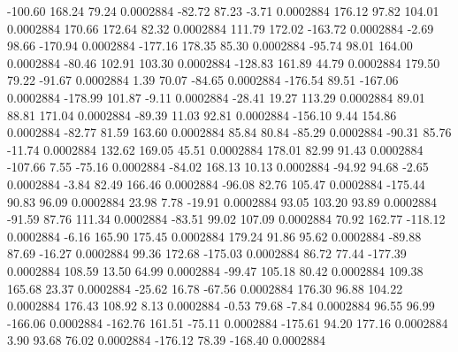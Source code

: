      -100.60      168.24       79.24     0.0002884
      -82.72       87.23       -3.71     0.0002884
      176.12       97.82      104.01     0.0002884
      170.66      172.64       82.32     0.0002884
      111.79      172.02     -163.72     0.0002884
       -2.69       98.66     -170.94     0.0002884
     -177.16      178.35       85.30     0.0002884
      -95.74       98.01      164.00     0.0002884
      -80.46      102.91      103.30     0.0002884
     -128.83      161.89       44.79     0.0002884
      179.50       79.22      -91.67     0.0002884
        1.39       70.07      -84.65     0.0002884
     -176.54       89.51     -167.06     0.0002884
     -178.99      101.87       -9.11     0.0002884
      -28.41       19.27      113.29     0.0002884
       89.01       88.81      171.04     0.0002884
      -89.39       11.03       92.81     0.0002884
     -156.10        9.44      154.86     0.0002884
      -82.77       81.59      163.60     0.0002884
       85.84       80.84      -85.29     0.0002884
      -90.31       85.76      -11.74     0.0002884
      132.62      169.05       45.51     0.0002884
      178.01       82.99       91.43     0.0002884
     -107.66        7.55      -75.16     0.0002884
      -84.02      168.13       10.13     0.0002884
      -94.92       94.68       -2.65     0.0002884
       -3.84       82.49      166.46     0.0002884
      -96.08       82.76      105.47     0.0002884
     -175.44       90.83       96.09     0.0002884
       23.98        7.78      -19.91     0.0002884
       93.05      103.20       93.89     0.0002884
      -91.59       87.76      111.34     0.0002884
      -83.51       99.02      107.09     0.0002884
       70.92      162.77     -118.12     0.0002884
       -6.16      165.90      175.45     0.0002884
      179.24       91.86       95.62     0.0002884
      -89.88       87.69      -16.27     0.0002884
       99.36      172.68     -175.03     0.0002884
       86.72       77.44     -177.39     0.0002884
      108.59       13.50       64.99     0.0002884
      -99.47      105.18       80.42     0.0002884
      109.38      165.68       23.37     0.0002884
      -25.62       16.78      -67.56     0.0002884
      176.30       96.88      104.22     0.0002884
      176.43      108.92        8.13     0.0002884
       -0.53       79.68       -7.84     0.0002884
       96.55       96.99     -166.06     0.0002884
     -162.76      161.51      -75.11     0.0002884
     -175.61       94.20      177.16     0.0002884
        3.90       93.68       76.02     0.0002884
     -176.12       78.39     -168.40     0.0002884
